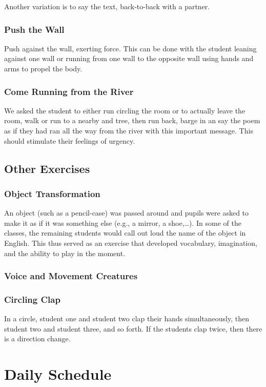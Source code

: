 \documentclass[article,twocolumn,twoside]{memoir}
\begin{document}
Another variation is to say the text, back-to-back with a partner.

\subsection{Push the Wall}

Push against the wall, exerting force. This can be done with the student
leaning against one wall or running from one wall to the opposite wall using
hands and arms to propel the body.

\subsection{Come Running from the River}

We asked the student to either run circling the room or to actually leave the
room, walk or run to a nearby and tree, then run back, barge in an say the poem
as if they had ran all the way from the river with this important message. This
should stimulate their feelings of urgency.

\section{Other Exercises}
\subsection{Object Transformation}
An object (such as a pencil-case) was passed around and pupils were asked to
make it as if it was something else (e.g., a mirror, a shoe,\dots). In some of
the classes, the remaining students would call out loud the name of the object
in English. This thus served as an exercise that developed vocabulary, imagination,
and the ability to play in the moment.

\subsection{Voice and Movement Creatures}
\subsection{Circling Clap}
In a circle, student one and student two clap their hands simultaneously,
then student two and student three, and so forth. If the students clap twice,
then there is a direction change.

\chapter{Daily Schedule}
\end{document}
